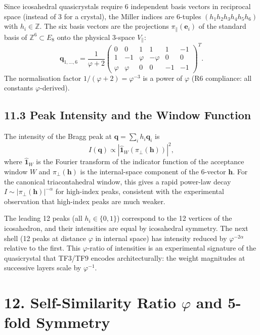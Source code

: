 Since icosahedral quasicrystals require 6
independent basis vectors in reciprocal space
(instead of 3 for a crystal), the Miller indices
are 6-tuples \((h_1 h_2 h_3 h_4 h_5 h_6)\) with
\(h_i \in \mathbb{Z}\). The six basis vectors
are the projections \(\pi_\parallel(\mathbf{e}_i)\)
of the standard basis of \(\mathbb{Z}^6 \subset
E_8\) onto the physical 3-space
\(V_\parallel\):
\[
  \mathbf{q}_{1,\ldots,6} = \frac{1}{\varphi+2}
  \begin{pmatrix}
    0 & 0 & 1 & 1 & 1 & -1 \\
    1 & -1 & \varphi & -\varphi & 0 & 0 \\
    \varphi & \varphi & 0 & 0 & -1 & -1
  \end{pmatrix}^T.
\]
The normalisation factor \(1/(\varphi+2) =
\varphi^{-3}\) is a power of \(\varphi\) (R6
compliance: all constants \(\varphi\)-derived).

\subsection{11.3 Peak Intensity and the Window
Function}\label{sec:peak-intensity}

The intensity of the Bragg peak at
\(\mathbf{q} = \sum_i h_i \mathbf{q}_i\) is
\[
  I(\mathbf{q}) \propto
    |\hat{\mathbf{1}}_W(\pi_\perp(\mathbf{h}))|^2,
\]
where \(\hat{\mathbf{1}}_W\) is the Fourier
transform of the indicator function of the
acceptance window \(W\) and
\(\pi_\perp(\mathbf{h})\) is the internal-space
component of the 6-vector \(\mathbf{h}\). For the
canonical triacontahedral window, this gives a
rapid power-law decay
\(I \sim |\pi_\perp(\mathbf{h})|^{-\alpha}\) for
high-index peaks, consistent with the experimental
observation that high-index peaks are much weaker.

The leading 12 peaks (all \(h_i \in \{0,1\}\))
correspond to the 12 vertices of the icosahedron,
and their intensities are equal by icosahedral
symmetry. The next shell (12 peaks at distance
\(\varphi\) in internal space) has intensity
reduced by \(\varphi^{-2 \alpha}\) relative to
the first. This \(\varphi\)-ratio of intensities
is an experimental signature of the quasicrystal
that TF3/TF9 encodes architecturally: the
weight magnitudes at successive layers scale by
\(\varphi^{-1}\).

\section{12. Self-Similarity Ratio
\texorpdfstring{$\varphi$}{phi} and 5-fold
Symmetry}\label{sec:selfsimilarity}

